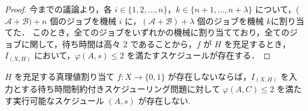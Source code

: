 \documentclass[12pt]{optlab-bachelor}
\begin{document}
\begin{proof}
  今までの議論より，各 $i \in \{1,2,\ldots,n\}$，$k \in \{n + 1,\ldots,n + \lambda\}$ について，($\mathcal{A} + \mathcal{B}) + n$ 個のジョブを機械 $i$ に，$(\mathcal{A} + \mathcal{B}) + \lambda$ 個のジョブを機械 $k$に割り当てた．
  このとき，全てのジョブをいずれかの機械に割り当てており，全てのジョブに関して，待ち時間は高々 2 であることから，$f$ が $H$ を充足するとき，$I_{(X,H)}$ において，$\varphi(A,s) \le 2$ を満たすスケジュールが存在する．
\end{proof}

\begin{lemma}\label{l_7}
  $H$ を充足する真理値割り当て $f : X \to \{0,1\}$ が存在しないならば，$I_{(X,H)}$ を入力とする待ち時間制約付きスケジューリング問題に対して $\varphi(A, C) \le 2$ を満たす実行可能なスケジュール $(A,s)$ が存在しない.
\end{lemma}
\end{document}

